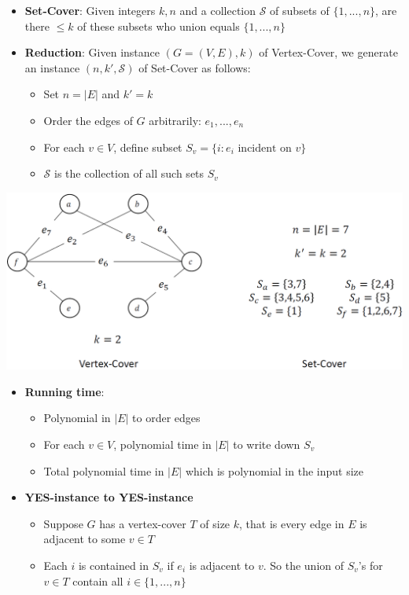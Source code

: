 \documentclass[10pt,landscape,a4paper]{article}
\begin{document}
\begin{multicols*}{4}
	\begin{itemize}
		\item \textbf{Set-Cover}: Given integers $k,n$ and a collection $\mathcal{S}$ of subsets of $\{1,...,n\}$, are there $\leq k$ of these subsets who union equals $\{1,...,n\}$
		\item \textbf{Reduction}: Given instance $(G=(V,E), k)$ of Vertex-Cover, we generate an instance $(n,k',\mathcal{S})$ of Set-Cover as follows:
		      \begin{itemize}
			      \item Set $n=|E|$ and $k'=k$
			      \item Order the edges of $G$ arbitrarily: $e_1,...,e_n$
			      \item For each $v\in V$, define subset $S_v=\{i:e_i\text{ incident on }v\}$
			      \item $\mathcal{S}$ is the collection of all such sets $S_v$
		      \end{itemize}
	\end{itemize}
	\begin{center}
		\includegraphics[width=0.6\columnwidth]{vertex-set}
	\end{center}
	\begin{itemize}
		\item \textbf{Running time}:
		      \begin{itemize}
			      \item Polynomial in $|E|$ to order edges
			      \item For each $v\in V$, polynomial time in $|E|$ to write down $S_v$
			      \item Total polynomial time in $|E|$ which is polynomial in the input size
		      \end{itemize}
		\item \textbf{YES-instance to YES-instance}
		      \begin{itemize}
			      \item Suppose $G$ has a vertex-cover $T$ of size $k$, that is every edge in $E$ is adjacent to some $v\in T$
			      \item Each $i$ is contained in $S_v$ if $e_i$ is adjacent to $v$. So the union of $S_v$'s for $v\in T$ contain all $i\in \{1,...,n\}$

\end{itemize}
\end{itemize}
\end{multicols*}
\end{document}
